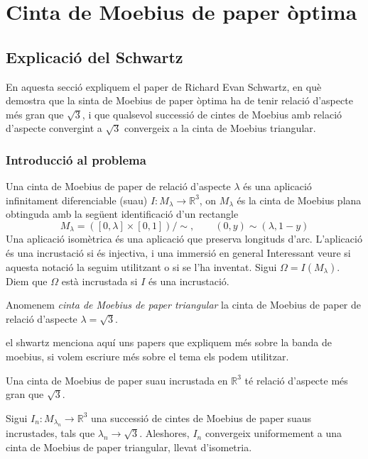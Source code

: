 \chapter{Cinta de Moebius de paper òptima}
\section{Explicació del Schwartz}
{\color{blue}En aquesta secció expliquem el paper de Richard Evan Schwartz, en què demostra que la sinta de Moebius de paper òptima ha de tenir relació d'aspecte més gran que $\sqrt{3}$, i que qualsevol successió de cintes de Moebius amb relació d'aspecte convergint a $\sqrt{3}$ convergeix a la cinta de Moebius triangular.}
\subsection{Introducció al problema}
\begin{defi}
    Una {\normalfont cinta de Moebius de paper de relació d'aspecte $\lambda$} és una aplicació infinitament diferenciable (suau) $I:M_{\lambda}\to\mathbb R^3$, on $M_\lambda$ és la cinta de Moebius plana obtinguda amb la següent identificació d'un rectangle
    $$M_\lambda = ([0,\lambda] \times [0,1])/\sim, \quad\quad (0,y)\sim(\lambda,1-y)$$
Una {\normalfont aplicació isomètrica} és una aplicació que preserva longituds d'arc. L'aplicació és una {\normalfont incrustació} si és injectiva, i una {\normalfont immersió} en general {\color{blue} Interessant veure si aquesta notació la seguim utilitzant o si se l'ha inventat}. Sigui $\Omega=I(M_\lambda)$. Diem que $\Omega$ està {\normalfont incrustada} si $I$ és una incrustació. 
\end{defi}
\begin{ex}
    Anomenem \textit{cinta de Moebius de paper triangular} la cinta de Moebius de paper de relació d'aspecte $\lambda = \sqrt{3}$.
\end{ex}
{\color{blue} el shwartz menciona aquí uns papers que expliquem més sobre la banda de moebius, si volem escriure més sobre el tema els podem utilitzar.}

\begin{teo}[Principal]\label{teo:Main Schwartz}
    Una cinta de Moebius de paper suau incrustada en $\mathbb R^3$ té relació d'aspecte més gran que $\sqrt{3}$.
\end{teo}

\begin{teo}\label{teo:Límit triangular}
    Sigui $I_n:M_{\lambda_n}\to\mathbb R^3$ una successió de cintes de Moebius de paper suaus incrustades, tals que $\lambda_n\to\sqrt{3}$. Aleshores, $I_n$ convergeix uniformement a una cinta de Moebius de paper triangular, llevat d'isometria.
\end{teo}
